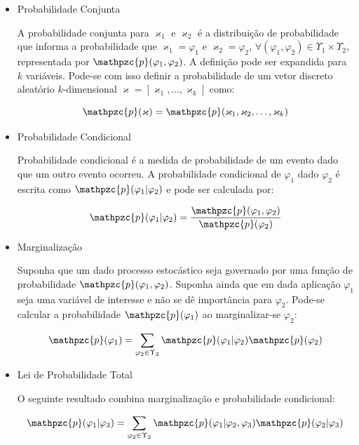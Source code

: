 {\begin{itemize}
\item Probabilidade Conjunta

A probabilidade conjunta para $\varkappa_1$ e $\varkappa_2$ é a distribuição de probabilidade que informa a probabilidade que $\varkappa_1 = \varphi_1$ e $\varkappa_2 = \varphi_2$, $\forall (\varphi_1, \varphi_2) \in \Upsilon_1 \times \Upsilon_2$, representada por $\mathpzc{p}(\varphi_1, \varphi_2)$. A definição pode ser expandida para $k$ variáveis. Pode-se com isso definir a probabilidade de um vetor discreto aleatório $k$-dimensional $\mathbf{\varkappa} = [\varkappa_1, \ldots, \varkappa_k]$ como:

\begin{equation}
\mathpzc{p}(\mathbf{\varkappa}) = \mathpzc{p}(\varkappa_1, \varkappa_2, \ldots, \varkappa_k) 
\end{equation}

\item Probabilidade Condicional

Probabilidade condicional é a medida de probabilidade de um evento dado que um outro evento ocorreu. A probabilidade condicional de $\varphi_1$ dado $\varphi_2$ é escrita como $\mathpzc{p}(\varphi_1 | \varphi_2)$ e pode ser calculada por:

\begin{equation}
\mathpzc{p}(\varphi_1 | \varphi_2) = \frac{\mathpzc{p}(\varphi_1, \varphi_2)}{\mathpzc{p}(\varphi_2)}
\end{equation}


\item Marginalização

Suponha que um dado processo estocástico seja governado por uma função de probabilidade $\mathpzc{p}(\varphi_1,\varphi_2)$.  Suponha ainda que em dada aplicação $\varphi_1$ seja uma variável de interesse e não se dê importância para $\varphi_2$. Pode-se calcular a probabilidade $\mathpzc{p}(\varphi_1)$ ao marginalizar-se $\varphi_2$:

\begin{equation}
\mathpzc{p}(\varphi_1) = \sum_{\varphi_2 \in \Upsilon_2} \mathpzc{p}(\varphi_1|\varphi_2)\mathpzc{p}(\varphi_2)
\end{equation}

\item Lei de Probabilidade Total

O seguinte resultado combina marginalização e probabilidade condicional:

\begin{equation}
\mathpzc{p}(\varphi_1|\varphi_3) = \sum_{\varphi_2 \in \Upsilon_2} \mathpzc{p}(\varphi_1|\varphi_2, \varphi_3)\mathpzc{p}(\varphi_2|\varphi_3)
\end{equation}


\end{itemize}}
